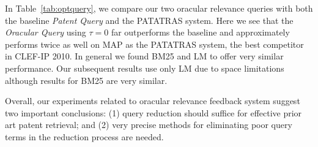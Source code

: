 In Table~\ref{tab:optquery}, we compare our two oracular relevance
queries with both the baseline \textit{Patent Query} and the PATATRAS system.  Here we see that
the \emph{Oracular Query} using $\tau=0$ far outperforms the baseline and
approximately performs twice as well on MAP as the PATATRAS system, the best competitor in
CLEF-IP 2010. 
In general we found BM25 and LM to offer very similar performance. Our subsequent results use only LM due to space limitations although results for BM25 are very similar.
%
%


Overall, our experiments related to oracular relevance feedback system
suggest two important conclusions: (1) query reduction should suffice for effective prior art patent retrieval; and (2) very precise methods for eliminating poor query terms in the reduction process are needed.


